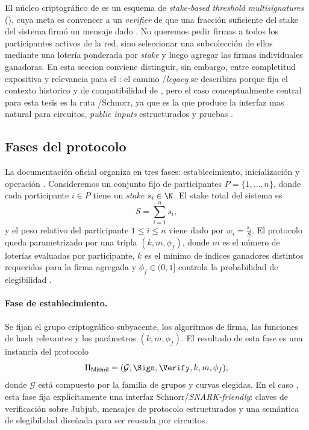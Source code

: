 
El núcleo criptográfico de \Mithril es un esquema de \textit{stake-based threshold multisignatures} (\STM), cuya meta es convencer a un \textit{verifier} de que una fracción suficiente del stake del sistema firmó un mensaje dado \cite{cryptoeprint:2021/916}. No queremos pedir firmas a todos los participantes activos de la red, sino seleccionar una subcolección de ellos mediante una lotería ponderada por \textit{stake} y luego agregar las firmas individuales ganadoras. En esta seccion conviene distinguir, sin embargo, entre completitud expositiva y relevancia para el \zkBridge: el camino \Pythagoras/\textit{legacy} se describira porque fija el contexto historico y de compatibilidad de \Mithril, pero el caso conceptualmente central para esta tesis es la ruta \Lagrange/Schnorr, ya que es la que produce la interfaz mas natural para circuitos, \textit{public inputs} estructurados y pruebas \ZK.

\subsection{Fases del protocolo}

La documentación oficial organiza \Mithril en tres fases: establecimiento, inicialización y operación \cite{MithrilDocsProtocol}. Consideremos un conjunto fijo de participantes $P = \{1,\ldots,n\}$, donde cada participante $i \in P$ tiene un \textit{stake} $s_i \in \N$. El stake total del sistema es
$$S = \sum_{i=1}^{n} s_i,$$
y el peso relativo del participante $1 \leq i \leq n$ viene dado por $w_i = \frac{s_i}{S}$. El protocolo queda parametrizado por una tripla $(k,m,\phi_f)$, donde $m$ es el número de loterías evaluadas por participante, $k$ es el mínimo de índices ganadores distintos requeridos para la firma agregada y $\phi_f \in (0,1]$ controla la probabilidad de elegibilidad \cite{cryptoeprint:2021/916,MithrilDocsProtocol}.

\paragraph{Fase de establecimiento.}

Se fijan el grupo criptográfico subyacente, los algoritmos de firma, las funciones de hash relevantes y los parámetros $(k,m,\phi_f)$. El resultado de esta fase es una instancia del protocolo
$$\Pi_{\mathsf{Mithril}} = (\mathcal{G}, \Sign, \Verify, k, m, \phi_f),$$
donde $\mathcal{G}$ está compuesto por la familia de grupos y curvas elegidas. En el caso \Lagrange, esta fase fija explícitamente una interfaz Schnorr/\textit{SNARK-friendly}: claves de verificación sobre Jubjub, mensajes de protocolo estructurados y una semántica de elegibilidad diseñada para ser reusada por circuitos.

